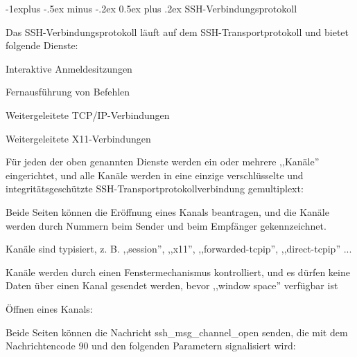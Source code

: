 \documentclass[a4paper]{article}
\makeatletter
\renewcommand{\subsection}{\@startsection{subsection}{2}{0mm}%
 {-1explus -.5ex minus -.2ex}%
 {0.5ex plus .2ex}%
 {\normalfont\normalsize\bfseries}}
\makeatother
\begin{document}
\begin{multicols}{3}
\begin{itemize*}
            \subsection{SSH-Verbindungsprotokoll}
            \begin{itemize*}
                  \item       Das SSH-Verbindungsprotokoll läuft auf dem SSH-Transportprotokoll und
                  bietet folgende Dienste:
                  \begin{itemize*}
                        \item Interaktive Anmeldesitzungen
                        \item Fernausführung von Befehlen
                        \item Weitergeleitete TCP/IP-Verbindungen
                        \item Weitergeleitete X11-Verbindungen
                  \end{itemize*}
                  \item       Für jeden der oben genannten Dienste werden ein oder mehrere
                  ,,Kanäle'' eingerichtet, und alle Kanäle werden in eine einzige
                  verschlüsselte und integritätsgeschützte
                  SSH-Transportprotokollverbindung gemultiplext:
                  \begin{itemize*}
                        \item Beide Seiten können die Eröffnung eines Kanals beantragen, und die Kanäle werden durch Nummern beim Sender und beim Empfänger gekennzeichnet.
                        \item Kanäle sind typisiert, z. B. ,,session'', ,,x11'', ,,forwarded-tcpip'', ,,direct-tcpip'' ...
                        \item Kanäle werden durch einen Fenstermechanismus kontrolliert, und es dürfen keine Daten über einen Kanal gesendet werden, bevor ,,window space'' verfügbar ist
                  \end{itemize*}
                  \item       Öffnen eines Kanals:
                  \begin{itemize*}
                        \item Beide Seiten können die Nachricht ssh\_msg\_channel\_open senden, die mit dem Nachrichtencode 90 und den folgenden Parametern signalisiert wird:

\end{itemize*}
\end{itemize*}
\end{itemize*}
\end{multicols}
\end{document}
